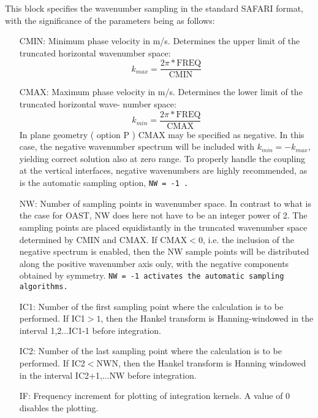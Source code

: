 This block specifies the wavenumber sampling in the standard SAFARI
format, with the significance of the parameters being as follows:
\begin{itemize}
		\item[CMIN:]   Minimum phase velocity in m/s. Determines the
		upper limit of the truncated horizontal wavenumber space:
			\begin{displaymath}
			k_{max} = \frac{2\pi \ast \mbox{FREQ}}{\mbox{CMIN}}
			\end{displaymath}
		\item[CMAX:]	Maximum phase velocity in m/s. Determines the
		lower limit of the truncated horizontal wave-
		number space:
			\begin{displaymath}
			k_{min} = \frac{2\pi \ast \mbox{FREQ}}{\mbox{CMAX}}
			\end{displaymath}
		In plane geometry ( option P ) CMAX may be specified as 
		negative. In this case, the negative wavenumber spectrum
		will be included with $k_{min}=-k_{max}$, yielding correct 
		solution also at zero range. 
                To properly handle the coupling at the vertical interfaces, 
                negative wavenumbers are highly recommended, as is the 
                automatic sampling option, \tt NW = -1 \rm. 
		\item[NW:]	Number of sampling points in wavenumber space.
		In contrast to what is the case for OAST, 
		NW does here not have to be an integer  power of 2.				The sampling points are placed equidistantly
		in the truncated wavenumber space determined
		by CMIN and CMAX. If CMAX$<0$, i.e. the inclusion of
		the negative spectrum is enabled, then the NW sample
		points will be distributed along the positive
		wavenumber axis only, with the negative
		components obtained by symmetry. 
                \tt NW = -1 \rm activates the automatic sampling algorithms.

		\item[IC1:]  Number of the first sampling point where the
		calculation is to be performed. If IC1$>1$, 
		then the Hankel transform is Hanning-windowed in the
		interval 1,2$\ldots$IC1-1 before integration.

		\item[IC2:]	Number of the last sampling point where the 
		calculation is to be performed. If IC2$<$NWN,
		then the Hankel transform is Hanning windowed in the
		interval IC2+1,$\ldots$NW before integration.

		\item[IF:] Frequency increment for plotting of
integration  kernels. A value of 0 disables the plotting.
		\end{itemize}
 
